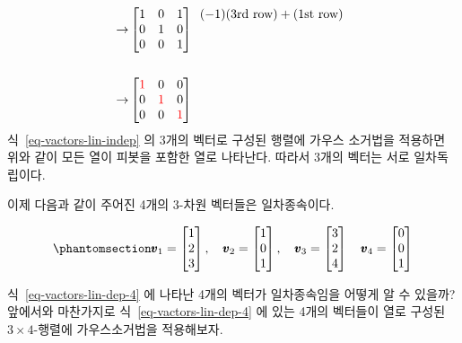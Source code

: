 \documentclass[
  11pt,
  a4paper,
  oneside]{scrbook}
\theoremstyle{definition}
\theoremstyle{definition}
\theoremstyle{plain}
\theoremstyle{remark}
\begin{document}
\[\begin{aligned}
& \\
\rightarrow
& 
\begin{bmatrix}
1 & 0 & 1\\
0 & 1 & 0\\
0 & 0 & 1 \\
\end{bmatrix}
\begin{array}{c}
(-1)(\text{3rd row}) + (\text{1st row})  \\
\\
\\
\end{array} \\
& \\
\rightarrow
& 
\begin{bmatrix}
\color{red}{1} & 0 & 0\\
0 & \color{red}{1} & 0\\
0 & 0 & \color{red}{1} \\
\end{bmatrix}
\end{aligned}
\] 식~\ref{eq-vactors-lin-indep} 의 3개의 벡터로 구성된 행렬에 가우스
소거법을 적용하면 위와 같이 모든 열이 피봇을 포함한 열로 나타난다.
따라서 3개의 벡터는 서로 일차독립이다.

이제 다음과 같이 주어진 4개의 3-차원 벡터들은 일차종속이다.

\begin{equation}\phantomsection\label{eq-vactors-lin-dep-4}{
\pmb v_1 =
\begin{bmatrix}
1\\
2\\
3
\end{bmatrix},
\quad
\pmb v_2 =
\begin{bmatrix}
1\\
0\\
1
\end{bmatrix},
\quad
\pmb v_3 =
\begin{bmatrix}
3\\
2\\
4
\end{bmatrix}
\quad
\pmb v_4 =
\begin{bmatrix}
0\\
0\\
1
\end{bmatrix}
}\end{equation}

식~\ref{eq-vactors-lin-dep-4} 에 나타난 4개의 벡터가 일차종속임을 어떻게
알 수 있을까? 앞에서와 마찬가지로 식~\ref{eq-vactors-lin-dep-4} 에 있는
4개의 벡터들이 열로 구성된 \(3 \times 4\)-행렬에 가우스소거법을
적용해보자.
\end{document}
